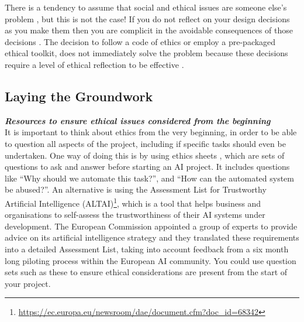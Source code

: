 There is a tendency to assume that social and ethical issues are someone else’s problem \citep{widder2023dislocated}, but this is not the case! If you do not reflect on your design decisions as you make them then you are complicit in the avoidable consequences of those decisions \citep{talat_disembodied_2021}. The decision to follow a code of ethics \cite{mcnamara2018does} or employ a pre-packaged ethical toolkit, does not immediately solve the problem because these decisions require a level of ethical reflection to be effective \citep{wong_seeing_2023}.

\subsection{Laying the Groundwork}\label{subsec:ideation}
\noindent\textbf{\textit{Resources to ensure ethical issues considered from the beginning}}\\

It is important to think about ethics from the very beginning, in order to be able to question all aspects of the project, including if specific tasks should even be undertaken.  One way of doing this is by using ethics sheets \citep{mohammad_ethics_2022}, which are sets of questions to ask and answer before starting an AI project. It includes questions like ``Why should we automate this task?'', and ``How can the automated system be abused?''. 
An alternative is using the Assessment List for Trustworthy Artificial Intelligence (ALTAI)\footnote{\url{https://ec.europa.eu/newsroom/dae/document.cfm?doc_id=68342}}, which is a tool that helps business and organisations to self-assess the trustworthiness of their AI systems under development. The European Commission appointed a group of experts to provide advice on its artificial intelligence strategy and they translated these requirements into a detailed Assessment List, taking into account feedback from a six month long piloting process within the European AI community. 
You could use question sets such as these to ensure ethical considerations are present from the start of your project. 

